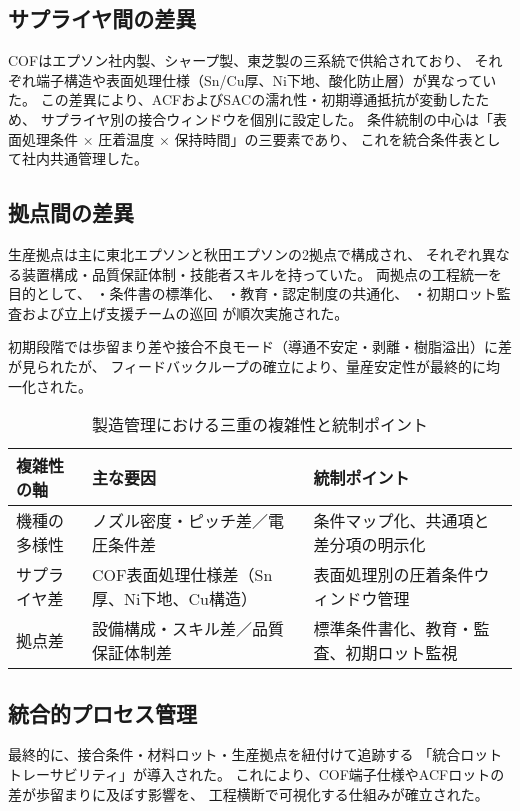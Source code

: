 \documentclass[conference]{IEEEtran}
\begin{document}
\subsection{サプライヤ間の差異}
COFはエプソン社内製、シャープ製、東芝製の三系統で供給されており、  
それぞれ端子構造や表面処理仕様（Sn/Cu厚、Ni下地、酸化防止層）が異なっていた。  
この差異により、ACFおよびSACの濡れ性・初期導通抵抗が変動したため、  
サプライヤ別の接合ウィンドウを個別に設定した。  
条件統制の中心は「表面処理条件 × 圧着温度 × 保持時間」の三要素であり、  
これを統合条件表として社内共通管理した。

\subsection{拠点間の差異}
生産拠点は主に東北エプソンと秋田エプソンの2拠点で構成され、  
それぞれ異なる装置構成・品質保証体制・技能者スキルを持っていた。  
両拠点の工程統一を目的として、  
・条件書の標準化、  
・教育・認定制度の共通化、  
・初期ロット監査および立上げ支援チームの巡回  
が順次実施された。  

初期段階では歩留まり差や接合不良モード（導通不安定・剥離・樹脂溢出）に差が見られたが、  
フィードバックループの確立により、量産安定性が最終的に均一化された。

\begin{table}[t]
\centering
\footnotesize
\caption{製造管理における三重の複雑性と統制ポイント}
\label{tab:complexity}
\renewcommand{\arraystretch}{1.1}
\begin{tabularx}{\columnwidth}{@{}p{2.3cm} Y Y@{}}
\toprule
複雑性の軸 & 主な要因 & 統制ポイント \\
\midrule
機種の多様性 &
ノズル密度・ピッチ差／電圧条件差 &
条件マップ化、共通項と差分項の明示化 \\
\addlinespace[2pt]
サプライヤ差 &
COF表面処理仕様差（Sn厚、Ni下地、Cu構造） &
表面処理別の圧着条件ウィンドウ管理 \\
\addlinespace[2pt]
拠点差 &
設備構成・スキル差／品質保証体制差 &
標準条件書化、教育・監査、初期ロット監視 \\
\bottomrule
\end{tabularx}
\end{table}

\subsection{統合的プロセス管理}
最終的に、接合条件・材料ロット・生産拠点を紐付けて追跡する  
「統合ロットトレーサビリティ」が導入された。  
これにより、COF端子仕様やACFロットの差が歩留まりに及ぼす影響を、  
工程横断で可視化する仕組みが確立された。  
\end{document}
